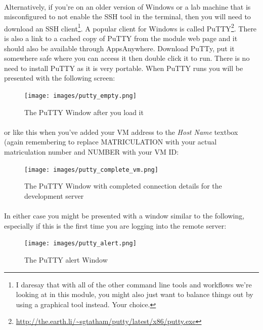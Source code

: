 \documentclass[12pt, a4paper, oneside]{book}
\begin{document}
\paragraph{} Alternatively, if you're on an older version of Windows or a lab machine that is misconfigured to not enable the SSH tool in the terminal, then you will need to download an SSH client\footnote{I daresay that with all of the other command line tools and workflows we're looking at in this module, you might also just want to balance things out by using a graphical tool instead. Your choice.}. A popular client for Windows is called PuTTY\footnote{\url{http://the.earth.li/~sgtatham/putty/latest/x86/putty.exe}}. There is also a link to a cached copy of PuTTY from the module web page and it should also be available through AppsAnywhere. Download PuTTy, put it somewhere safe where you can access it then double click it to run. There is no need to install PuTTY as it is very portable. When PuTTY runs you will be presented with the following screen:

\begin{figure}[H]
\centering
\texttt{[image: images/putty\_empty.png]}
\caption{The PuTTY Window after you load it}
\label{fig:putty-empty}
\end{figure}

\paragraph{} or like this when you've added your VM address to the \emph{Host Name} textbox (again remembering to replace MATRICULATION with your actual matriculation number and NUMBER with your VM ID:

\begin{figure}[H]
\centering
\texttt{[image: images/putty\_complete\_vm.png]}
\caption{The PuTTY Window with completed connection details for the development server}
\label{fig:putty-complete}
\end{figure}


\paragraph{} In either case you might be presented with a window similar to the following, especially if this is the first time you are logging into the remote server:

\begin{figure}[H]
\centering
\texttt{[image: images/putty\_alert.png]}
\caption{The PuTTY alert Window}
\label{fig:putty-alert}
\end{figure}
\end{document}
